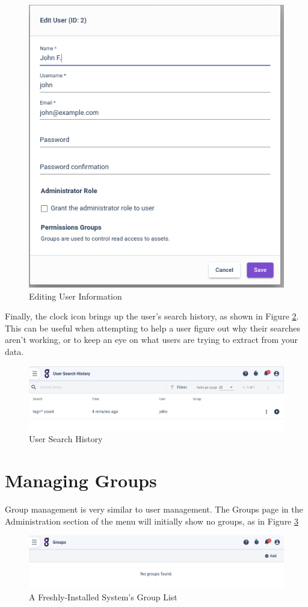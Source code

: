 \begin{figure}
	\includegraphics[width=0.55\linewidth]{images/edituser.png}
	\caption{Editing User Information}
	\label{fig:edituser}
\end{figure}

Finally, the clock icon brings up the user's search history, as shown in Figure \ref{fig:userhistory}.
This can be useful when attempting to help a user figure out why their searches
aren't working, or to keep an eye on what users are trying to extract
from your data.

\begin{figure}
	\includegraphics[width=0.9\linewidth]{images/userhistory.png}
	\caption{User Search History}
	\label{fig:userhistory}
\end{figure}

\section{Managing Groups}

Group management is very similar to user management. The Groups page in
the Administration section of the menu will initially show no groups, as in
Figure \ref{fig:fresh-groups}

\begin{figure}[H]
	\includegraphics{images/empty-groups.png}
	\caption{A Freshly-Installed System's Group List}
	\label{fig:fresh-groups}
\end{figure}

